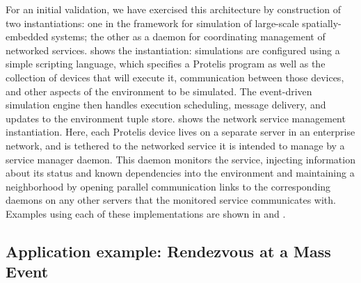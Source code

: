 \documentclass[12pt,a4paper,twoside,openright]{book}
\begin{document}
For an initial validation, we have exercised this architecture by construction of two instantiations: one in the \alchemist{} framework for simulation of large-scale spatially-embedded systems; the other as a daemon for coordinating management of networked services.
%
 shows the \alchemist{} instantiation: simulations are configured using a simple scripting language, which specifies a Protelis program as well as the collection of devices that will execute it, communication between those devices, and other aspects of the environment to be simulated.
%
The \alchemist{} event-driven simulation engine then handles execution scheduling, message delivery, and updates to the environment tuple store.
%
 shows the network service management instantiation.
%
Here, each Protelis device lives on a separate server in an enterprise network, and is tethered to the networked service it is intended to manage by a service manager daemon.
%
This daemon monitors the service, injecting information about its status and known dependencies into the environment and maintaining a neighborhood by opening parallel communication links to the corresponding daemons on any other servers that the monitored service communicates with.
%
Examples using each of these implementations are shown in  and .

\subsection{Application example: Rendezvous at a Mass Event}
\label{protelis-rendezvous}
\end{document}
